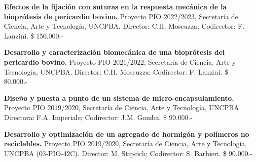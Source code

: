 \textbf{Efectos de la fijación con suturas en la respuesta mecánica de la bioprótesis de pericardio bovino.} Proyecto PIO 2022/2023, Secretaría de Ciencia, Arte y Tecnología, UNCPBA. Director: C.H. Moscuzza; Codirector: F. Lanzini. \$ 150.000.-

\textbf{Desarrollo y caracterización biomecánica de una bioprótesis del pericardio bovino.} Proyecto PIO 2021/2022, Secretaría de Ciencia, Arte y Tecnología, UNCPBA. Director: C.H. Moscuzza; Codirector: F. Lanzini. \$ 80.000.-

\textbf{Diseño y puesta a punto de un sistema de micro-encapsulamiento.} Proyecto PIO 2019/2020, Secretaría de Ciencia, Arte y Tecnología, UNCPBA. Directora: F.A. Imperiale; Codirector: J.M. Gomba. \$ 90.000.-

\textbf{Desarrollo y optimización de un agregado de hormigón y polímeros no reciclables.} Proyecto PIO 2019/2020, Secretaría de Ciencia, Arte y Tecnología, UNCPBA (03-PIO-42C). Director: M. Stipcich; Codirector: S. Barbieri. \$ 90.000.-